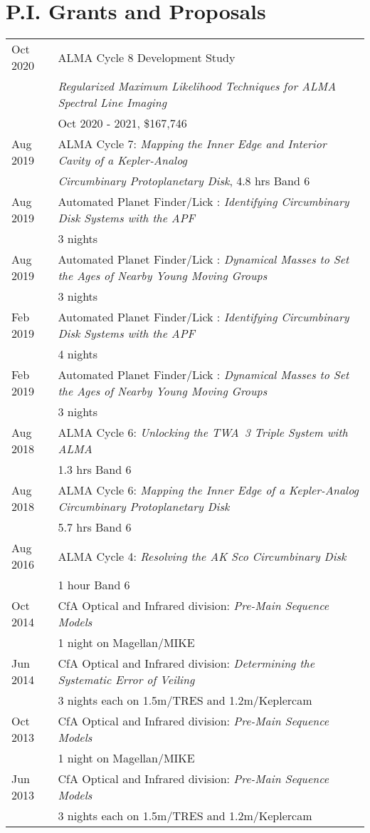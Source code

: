 \section*{P.I. Grants and Proposals}
\begin{tabular*}{\textwidth}{@{\hspace{10pt}}p{1.2in}l}
  Oct 2020 & ALMA Cycle 8 Development Study\\
  & \emph{Regularized Maximum Likelihood Techniques for ALMA Spectral Line Imaging} \\
  & Oct 2020 - 2021, \$167,746 \\
  Aug 2019 & ALMA Cycle 7: \emph{Mapping the Inner Edge and Interior Cavity of a Kepler-Analog}\\
  & \emph{Circumbinary Protoplanetary Disk}, 4.8 hrs Band 6\\
  Aug 2019 & Automated Planet Finder/Lick : \emph{Identifying Circumbinary Disk Systems with the APF} \\
  & 3 nights \\
  Aug 2019 & Automated Planet Finder/Lick : \emph{Dynamical Masses to Set the Ages of Nearby Young Moving Groups} \\
  & 3 nights \\
  Feb 2019 & Automated Planet Finder/Lick : \emph{Identifying Circumbinary Disk Systems with the APF} \\
  & 4 nights \\
  Feb 2019 & Automated Planet Finder/Lick : \emph{Dynamical Masses to Set the Ages of Nearby Young Moving Groups} \\
  & 3 nights \\
  Aug 2018 & ALMA Cycle 6: \emph{Unlocking the TWA~3 Triple System with ALMA}\\
  & 1.3 hrs Band 6\\
  Aug 2018 & ALMA Cycle 6: \emph{Mapping the Inner Edge of a Kepler-Analog Circumbinary Protoplanetary Disk}\\
  & 5.7 hrs Band 6\\
  Aug 2016 & ALMA Cycle 4: \emph{Resolving the AK Sco Circumbinary Disk}\\
  & 1 hour Band 6\\
  Oct 2014 & CfA Optical and Infrared division: \emph{Pre-Main Sequence Models}\\
  & 1 night on Magellan/MIKE\\
  Jun 2014 & CfA Optical and Infrared division: \emph{Determining the Systematic Error of Veiling}\\
  & 3 nights each on 1.5m/TRES and 1.2m/Keplercam\\
  Oct 2013 & CfA Optical and Infrared division: \emph{Pre-Main Sequence Models} \\
  & 1 night on Magellan/MIKE\\
  Jun 2013 & CfA Optical and Infrared division: \emph{Pre-Main Sequence Models}\\
  &  3 nights each on 1.5m/TRES and 1.2m/Keplercam\\
\end{tabular*}
